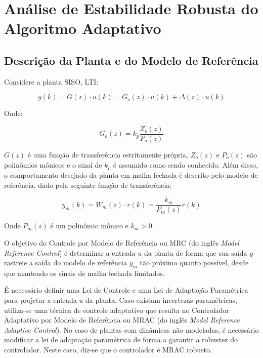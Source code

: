 
\chapter{Análise de Estabilidade Robusta
    do Algoritmo Adaptativo}\label{provas}

\section{Descrição da Planta e do Modelo de Referência}

    Considere a planta SISO, LTI:

    \begin{equation}
        y(k) = G(z) \cdot u(k) = G_o(z) \cdot u(k) + \Delta(z) \cdot u(k)
        \label{eq:saida_da_planta}
    \end{equation}

    Onde:

    \begin{equation}
        G_o(z) = k_p \frac{Z_o(z)}{P_o(z)}
    \end{equation}

    $G(z)$ é uma função de transferência estritamente própria, $Z_o(z)$ e $P_o(z)$
    são polinômios mônicos e o sinal de $k_p$ é assumido como sendo conhecido. Além
    disso, o comportamento desejado da planta em malha fechada é descrito pelo modelo de
    referência, dado pela seguinte função de transferência:

    \begin{equation}
        y_m(k) = W_m(z) \cdot r(k) = \frac{k_m}{P_m(z)} r(k)
        \label{eq:saida_do_modelo_de_referencia}
    \end{equation}

    Onde $P_m(z)$ é um polinômio mônico e $k_m > 0$.

    O objetivo do Controle por Modelo de Referência ou MRC (do inglês \emph{Model
    Reference Control}) é determinar a entrada $u$ da planta de forma que sua saída
    $y$ rastreie a saída do modelo de referência $y_m$ tão próximo quanto possível,
    desde que mantendo os sinais de malha fechada limitados.

    É necessário definir uma Lei de Controle e uma Lei de Adaptação Paramétrica para
    projetar a entrada $u$ da planta. Caso existam incertezas paramétricas, utiliza-se
    uma técnica de controle adaptativo que resulta no Controlador Adaptativo por Modelo
    de Referência ou MRAC (do inglês \emph{Model Reference Adaptive Control}).
    No caso de plantas com dinâmicas não-modeladas, é
    necessário modificar a lei de adaptação paramétrica de forma a garantir a robustez
    do controlador. Neste caso, diz-se que o controlador é MRAC robusto.

